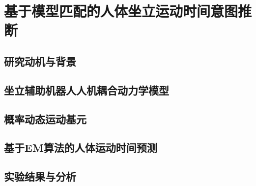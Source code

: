 \chapter{基于模型匹配的人体坐立运动时间意图推断}

\section{研究动机与背景}    

\section{坐立辅助机器人人机耦合动力学模型}  

\section{概率动态运动基元}   

\section{基于EM算法的人体运动时间预测}

\section{实验结果与分析}
